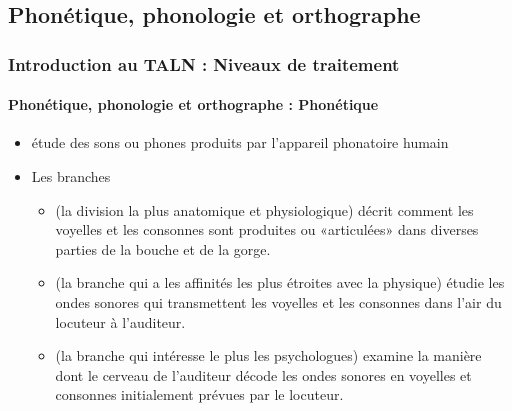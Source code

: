 \documentclass[xcolor=table]{beamer}
\begin{document}
\subsection{Phonétique, phonologie et orthographe}

\begin{frame}
\frametitle{Introduction au TALN : Niveaux de traitement}
\framesubtitle{Phonétique, phonologie et orthographe : Phonétique}

\begin{itemize}
	\item étude des sons ou phones produits par l'appareil phonatoire humain
	\item Les branches
	\begin{itemize}
		\item {} (la division la plus anatomique et physiologique) décrit comment les voyelles et les consonnes sont produites ou «articulées» dans diverses parties de la bouche et de la gorge.
		\item {} (la branche qui a les affinités les plus étroites avec la physique) étudie les ondes sonores qui transmettent les voyelles et les consonnes dans l'air du locuteur à l'auditeur.
		\item {} (la branche qui intéresse le plus les psychologues) examine la manière dont le cerveau de l'auditeur décode les ondes sonores en voyelles et consonnes initialement prévues par le locuteur.
	\end{itemize}
\end{itemize}

\end{frame}
\end{document}
